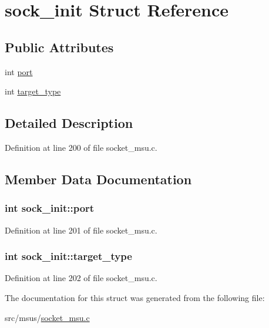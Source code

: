 \hypertarget{structsock__init}{\section{sock\-\_\-init Struct Reference}
\label{structsock__init}
}
\subsection*{Public Attributes}
\begin{DoxyCompactItemize}
\item 
int \hyperlink{structsock__init_ac593df260ab8a897e1d2238746b2815a}{port}
\item 
int \hyperlink{structsock__init_a17b3cc4807be7313acf0de7aea1cf1fb}{target\-\_\-type}
\end{DoxyCompactItemize}


\subsection{Detailed Description}


Definition at line 200 of file socket\-\_\-msu.\-c.



\subsection{Member Data Documentation}
\hypertarget{structsock__init_ac593df260ab8a897e1d2238746b2815a}{
\subsubsection[{port}]{\setlength{\rightskip}{0pt plus 5cm}int sock\-\_\-init\-::port}}\label{structsock__init_ac593df260ab8a897e1d2238746b2815a}


Definition at line 201 of file socket\-\_\-msu.\-c.

\hypertarget{structsock__init_a17b3cc4807be7313acf0de7aea1cf1fb}{
\subsubsection[{target\-\_\-type}]{\setlength{\rightskip}{0pt plus 5cm}int sock\-\_\-init\-::target\-\_\-type}}\label{structsock__init_a17b3cc4807be7313acf0de7aea1cf1fb}


Definition at line 202 of file socket\-\_\-msu.\-c.



The documentation for this struct was generated from the following file\-:\begin{DoxyCompactItemize}
\item 
src/msus/\hyperlink{socket__msu_8c}{socket\-\_\-msu.\-c}\end{DoxyCompactItemize}
